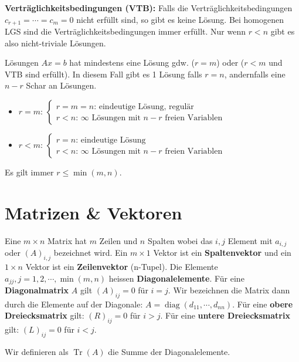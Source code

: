 \documentclass[a4paper,10pt]{article}
\DeclareMathOperator{\Tr}{Tr}
\DeclareMathOperator{\diag}{diag}
\begin{document}
\textbf{Verträglichkeitsbedingungen (VTB):} Falls die Verträglichkeitsbedingungen $c_{r+1} = \cdots = c_m = 0$ nicht erfüllt sind, so gibt es keine Lösung. Bei homogenen LGS sind die Verträglichkeitsbedingungen immer erfüllt. Nur wenn $r < n$ gibt es also nicht-triviale Lösungen.\\

\begin{subbox}{Lösungen}
  $Ax = b$ hat mindestens eine Lösung gdw. ($r = m$) oder ($r < m$ und VTB sind erfüllt). In diesem Fall gibt es 1 Lösung falls $r = n$, andernfalls eine $n - r$ Schar an Lösungen.
  \begin{itemize}
    \item $r = m$: $\begin{cases}
      r = m = n\text{: eindeutige Lösung, regulär}\\
      r < n\text{: }\infty\text{ Lösungen mit } n - r \text{ freien Variablen}
    \end{cases}$\\
    \item $r < m$: $\begin{cases}
      r = n\text{: eindeutige Lösung}\\
      r < n\text{: }\infty\text{ Lösungen mit } n - r \text{ freien Variablen}
    \end{cases}$
  \end{itemize}
\end{subbox}

Es gilt immer $r \leq \min(m, n)$.

\section{Matrizen \& Vektoren}

Eine $m \times n$ Matrix hat $m$ Zeilen und $n$ Spalten wobei das $i,j$ Element mit $a_{i,j}$ oder $(A)_{i,j}$ bezeichnet wird. Ein $m \times 1$ Vektor ist ein \textbf{Spaltenvektor} und ein $1 \times n$ Vektor ist ein \textbf{Zeilenvektor} (n-Tupel). Die Elemente $a_{jj}, j = 1,2,\cdots,\min(m,n)$ heissen \textbf{Diagonalelemente}. Für eine \textbf{Diagonalmatrix} $A$ gilt $(A)_{ij} = 0$ für $i = j$. Wir bezeichnen die Matrix dann durch die Elemente auf der Diagonale: $A = \diag(d_{11}, \cdots, d_{nn})$. Für eine \textbf{obere Dreiecksmatrix} gilt: $(R)_{ij} = 0$ für $i > j$. Für eine \textbf{untere Dreiecksmatrix} gilt: $(L)_{ij} = 0$ für $i < j$. 

Wir definieren als $\Tr(A)$ die Summe der Diagonalelemente.
\end{document}
